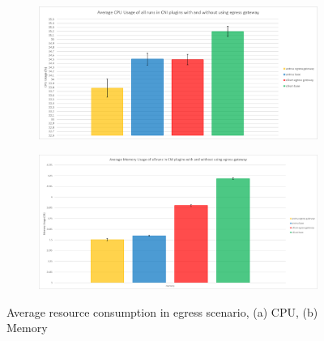 \begin{figure}[H]
    \centering
    \begin{subfigure}[b]{0.55\textwidth}
        \includegraphics[width=\textwidth]{plots/egress/cpu_total_average.png}
        \caption{}
        \label{fig:cpu_avg}
    \end{subfigure}
    \begin{subfigure}[b]{0.55\textwidth}
        \includegraphics[width=\textwidth]{plots/egress/memory_total_average.png}
        \caption{}
        \label{fig:memory_avg}
    \end{subfigure}
    
    \caption{Average resource consumption in egress scenario, (a) CPU, (b) Memory}
    \label{fig:res_avg}
\end{figure}



